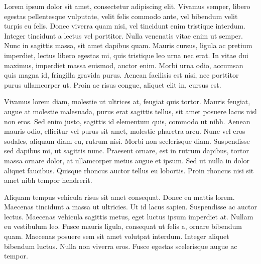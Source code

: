 
Lorem ipsum dolor sit amet, consectetur adipiscing elit. Vivamus semper, libero egestas pellentesque vulputate, velit felis commodo ante, vel bibendum velit turpis eu felis. Donec viverra quam nisi, vel tincidunt enim tristique interdum. Integer tincidunt a lectus vel porttitor. Nulla venenatis vitae enim ut semper. Nunc in sagittis massa, sit amet dapibus quam. Mauris cursus, ligula ac pretium imperdiet, lectus libero egestas mi, quis tristique leo urna nec erat. In vitae dui maximus, imperdiet massa euismod, auctor enim. Morbi urna odio, accumsan quis magna id, fringilla gravida purus. Aenean facilisis est nisi, nec porttitor purus ullamcorper ut. Proin ac risus congue, aliquet elit in, cursus est.

Vivamus lorem diam, molestie ut ultrices at, feugiat quis tortor. Mauris feugiat, augue at molestie malesuada, purus erat sagittis tellus, sit amet posuere lacus nisl non eros. Sed enim justo, sagittis id elementum quis, commodo ut nibh. Aenean mauris odio, efficitur vel purus sit amet, molestie pharetra arcu. Nunc vel eros sodales, aliquam diam eu, rutrum nisi. Morbi non scelerisque diam. Suspendisse sed dapibus mi, ut sagittis nunc. Praesent ornare, est in rutrum dapibus, tortor massa ornare dolor, at ullamcorper metus augue et ipsum. Sed ut nulla in dolor aliquet faucibus. Quisque rhoncus auctor tellus eu lobortis. Proin rhoncus nisi sit amet nibh tempor hendrerit.

Aliquam tempus vehicula risus sit amet consequat. Donec eu mattis lorem. Maecenas tincidunt a massa ut ultricies. Ut id lacus sapien. Suspendisse ac auctor lectus. Maecenas vehicula sagittis metus, eget luctus ipsum imperdiet at. Nullam eu vestibulum leo. Fusce mauris ligula, consequat ut felis a, ornare bibendum quam. Maecenas posuere sem sit amet volutpat interdum. Integer aliquet bibendum luctus. Nulla non viverra eros. Fusce egestas scelerisque augue ac tempor.


